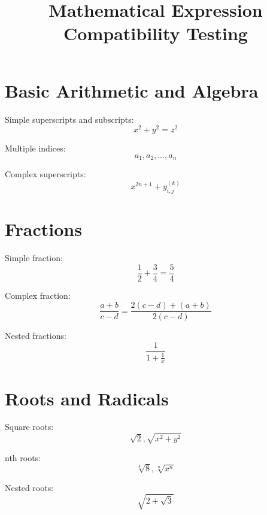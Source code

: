 \documentclass{article}
\begin{document}
\title{Mathematical Expression Compatibility Testing}
\maketitle

\section{Basic Arithmetic and Algebra}
Simple superscripts and subscripts:
\begin{equation}
x^2 + y^2 = z^2
\end{equation}

Multiple indices:
\begin{equation}
a_1, a_2, \ldots, a_n
\end{equation}

Complex superscripts:
\begin{equation}
x^{2n+1} + y_{i,j}^{(k)}
\end{equation}

\section{Fractions}
Simple fraction:
\begin{equation}
\frac{1}{2} + \frac{3}{4} = \frac{5}{4}
\end{equation}

Complex fraction:
\begin{equation}
\frac{a+b}{c-d} = \frac{2(c-d) + (a+b)}{2(c-d)}
\end{equation}

Nested fractions:
\begin{equation}
\frac{1}{1+\frac{1}{x}}
\end{equation}

\section{Roots and Radicals}
Square roots:
\begin{equation}
\sqrt{2}, \sqrt{x^2 + y^2}
\end{equation}

nth roots:
\begin{equation}
\sqrt[3]{8}, \sqrt[n]{x^n}
\end{equation}

Nested roots:
\begin{equation}
\sqrt{2 + \sqrt{3}}
\end{equation}
\end{document}
